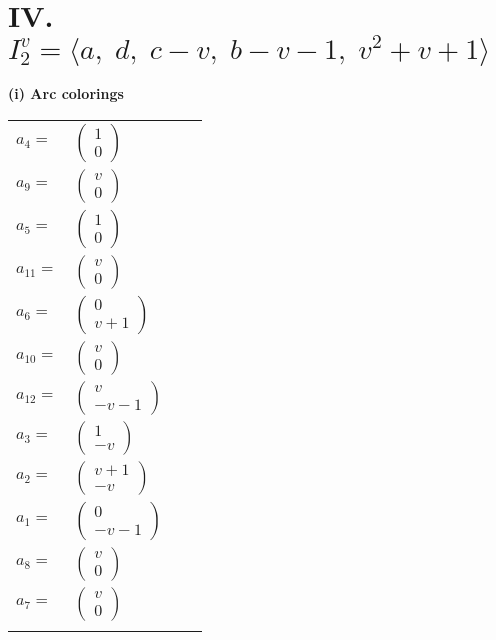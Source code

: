 \documentclass[1p]{elsarticle_modified}
\theoremstyle{definition}
\begin{document}
\centering \section*{IV. $I^v_{2}= \langle a,\;d,\;c- v,\;b- v-1,\;v^2+v+1 \rangle$}
\flushleft \textbf{(i) Arc colorings}\\
\begin{tabular}{m{7pt} m{180pt} m{7pt} m{180pt} }
\flushright $a_{4}=$&$\begin{pmatrix}1\\0\end{pmatrix}$ \\
\flushright $a_{9}=$&$\begin{pmatrix}v\\0\end{pmatrix}$ \\
\flushright $a_{5}=$&$\begin{pmatrix}1\\0\end{pmatrix}$ \\
\flushright $a_{11}=$&$\begin{pmatrix}v\\0\end{pmatrix}$ \\
\flushright $a_{6}=$&$\begin{pmatrix}0\\v+1\end{pmatrix}$ \\
\flushright $a_{10}=$&$\begin{pmatrix}v\\0\end{pmatrix}$ \\
\flushright $a_{12}=$&$\begin{pmatrix}v\\- v-1\end{pmatrix}$ \\
\flushright $a_{3}=$&$\begin{pmatrix}1\\- v\end{pmatrix}$ \\
\flushright $a_{2}=$&$\begin{pmatrix}v+1\\- v\end{pmatrix}$ \\
\flushright $a_{1}=$&$\begin{pmatrix}0\\- v-1\end{pmatrix}$ \\
\flushright $a_{8}=$&$\begin{pmatrix}v\\0\end{pmatrix}$ \\
\flushright $a_{7}=$&$\begin{pmatrix}v\\0\end{pmatrix}$\\&\end{tabular}
\end{document}
